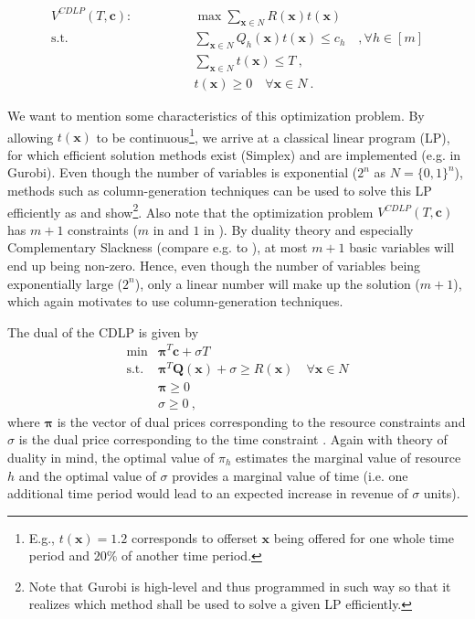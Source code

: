 \begin{align}
V^{CDLP}(T, \boldsymbol{c}): \qquad\qquad & \max \sum_{\boldsymbol{x}\in N} R(\boldsymbol{x}) t(\boldsymbol{x})\\
\text{s.t. } & \sum_{\boldsymbol{x}\in N} Q_h(\boldsymbol{x}) t(\boldsymbol{x}) \leq c_h \quad, \forall h \in [m]\label{eq:CDLP-m}\\
& \sum_{\boldsymbol{x}\in N} t(\boldsymbol{x}) \leq T~,\label{eq:CDLP-1}\\
& t(\boldsymbol{x}) \geq 0 \quad \forall \boldsymbol{x} \in N~.
\end{align}

We want to mention some characteristics of this optimization problem. By allowing $t(\boldsymbol{x})$ to be continuous\footnote{E.g., $t(\boldsymbol{x})=1.2$ corresponds to offerset $\boldsymbol{x}$ being offered for one whole time period and $20\%$ of another time period.}, we arrive at a classical linear program (LP), for which efficient solution methods exist (Simplex) and  are implemented (e.g. in Gurobi). Even though the number of variables is exponential ($2^n$ as $N = \{0,1\}^n$), methods such as column-generation techniques can be used to solve this LP efficiently as \cite{GGallego.} and \cite{Liu.2008} show\footnote{Note that Gurobi is high-level and thus programmed in such way so that it realizes which method shall be used to solve a given LP efficiently.}. Also note that the optimization problem $V^{CDLP}(T, \boldsymbol{c})$ has $m+1$ constraints ($m$ in  and $1$ in ). By duality theory and especially Complementary Slackness (compare e.g. to \cite{Domschke.2015}), at most $m+1$ basic variables will end up being non-zero. Hence, even though the number of variables being exponentially large ($2^n$), only a linear number will make up the solution ($m+1$), which again motivates to use column-generation techniques.

The dual of the CDLP is given by
\begin{align}
	\min &\boldsymbol{\pi}^T \boldsymbol{c} + \sigma T\\
	\text{s.t.} &\boldsymbol{\pi}^T \boldsymbol{Q}(\boldsymbol{x}) + \sigma \geq R(\boldsymbol{x}) \quad \forall \boldsymbol{x}\in N\\
	& \boldsymbol{\pi} \geq 0\\
	& \sigma \geq 0 ~,
\end{align}
where $\boldsymbol{\pi}$ is the vector of dual prices corresponding to the resource constraints  and $\sigma$ is the dual price corresponding to the time constraint . Again with theory of duality in mind, the optimal value of $\pi_h$ estimates the marginal value of resource $h$ and the optimal value of $\sigma$ provides a marginal value of time (i.e. one additional time period would lead to an expected increase in revenue of $\sigma$ units).

